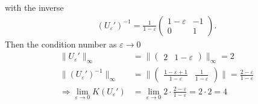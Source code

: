 with the inverse
\begin{align}
    (U_\varepsilon')^{-1} = \frac{1}{1-\varepsilon}
    \begin{pmatrix} 1-\varepsilon & - 1\\ 0 & 1 \end{pmatrix}.
\end{align}
Then the condition number as $\varepsilon \rightarrow 0$
\begin{align}
    \|U_\varepsilon'\|_\infty
    &= \|\begin{pmatrix} 2 & 1-\varepsilon \end{pmatrix} \|_\infty = 2\\
    \|\left(U_\varepsilon'\right)^{-1} \|_\infty
    &=  \|\begin{pmatrix}
    \frac{1-\varepsilon + 1}{1 - \varepsilon} & \frac{1}{1-\varepsilon}
    \end{pmatrix} \| = \frac{2-\varepsilon}{1-\varepsilon}\\
    \Longrightarrow
    \lim_{\varepsilon \to 0}K(U_\varepsilon') &= \lim_{\varepsilon \to 0}
    2\cdot \frac{2-\varepsilon}{1-\varepsilon} = 2\cdot2 = 4
\end{align}
